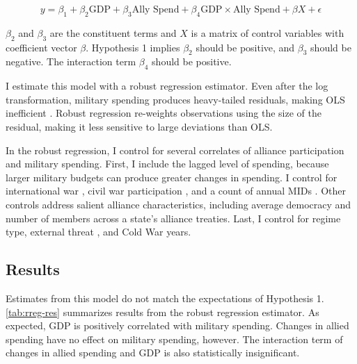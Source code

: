 \documentclass[12pt]{article}
\begin{document}
\begin{equation} 
y = \beta_1 + \beta_2 \mbox{GDP} + \beta_3 \mbox{Ally Spend} + \beta_4 \mbox{GDP} \times \mbox{Ally Spend} + \beta X + \epsilon
\end{equation}


$\beta_2$ and $\beta_3$ are the constituent terms and $X$ is a matrix of control variables with coefficient vector $\beta$.
Hypothesis 1 implies $\beta_2$ should be positive, and $\beta_3$ should be negative. 
The interaction term $\beta_4$ should be positive. 


I estimate this model with a robust regression estimator. 
Even after the log transformation, military spending produces heavy-tailed residuals, making OLS inefficient \citep{RaineyBaissa2018}. 
Robust regression re-weights observations using the size of the residual, making it less sensitive to large deviations than OLS. 


In the robust regression, I control for several correlates of alliance participation and military spending. 
First, I include the lagged level of spending, because larger military budgets can produce greater changes in spending. 
I control for international war \citep{Reiteretal2016}, civil war participation \citep{SarkeesWayman2010}, and a count of annual MIDs \citep{Gibleretal2016}. 
Other controls address salient alliance characteristics, including average democracy and number of members across a state's alliance treaties.   
Last, I control for regime type, external threat \citep{LeedsSavun2007}, and Cold War years. 


\subsection{Results}


Estimates from this model do not match the expectations of Hypothesis 1. 
\autoref{tab:rreg-res} summarizes results from the robust regression estimator. 
As expected, GDP is positively correlated with military spending. 
Changes in allied spending have no effect on military spending, however. 
The interaction term of changes in allied spending and GDP is also statistically insignificant. 
\end{document}
